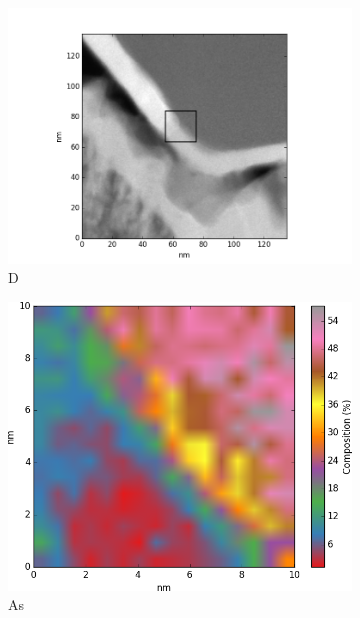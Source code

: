 \begin{figure}
	\centering
	\begin{subfigure}{0.5\linewidth}
		\includegraphics[width=\linewidth]{fig/q/D-E/D}
		\caption{D}
		\label{fig:D-overview}
	\end{subfigure}
	\hfill
	\begin{subfigure}{0.45\linewidth}
		\includegraphics[width=\linewidth]{fig/q/D-E-trim/D_heatedGeKlineHEATMAP/As_zeta}
		\caption{As}
		\label{fig:Das}
	\end{subfigure}%
	\hfill
	\begin{subfigure}{0.45\linewidth}

\end{subfigure}
\end{figure}
